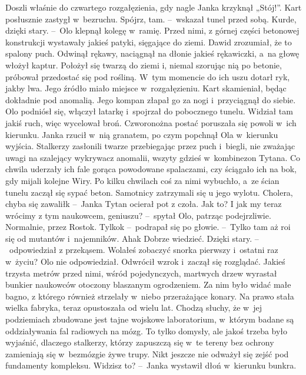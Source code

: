 \documentclass[../MAIN.tex]{subfiles}
\begin{document}
Doszli właśnie do czwartego rozgałęzienia, gdy nagle Janka krzyknął „Stój!”. Kart posłusznie zastygł w~bezruchu.
\sx Spójrz, tam. --~wskazał tunel przed sobą.
\xx Kurde, dzięki stary. --~Olo klepnął kolegę w~ramię.
\qd
\hspace{23.6em}Przed nimi, z górnej części betonowej konstrukcji wystawały jakieś patyki, sięgające do ziemi. Dawid zrozumiał, że to spalony puch. Odwinął rękawy, naciągnął na dłonie jakieś rękawiczki, a~na głowę włożył kaptur. Położył się twarzą do ziemi i, niemal szorując nią po betonie, próbował przedostać się pod rośliną. W~tym momencie do ich uszu dotarł ryk, jakby lwa. Jego źródło miało miejsce w~rozgałęzieniu. Kart skamieniał, będąc dokładnie pod anomalią. Jego kompan złapał go za nogi i~przyciągnął do siebie. Olo podniósł się, włączył latarkę i~spojrzał do pobocznego tunelu. Widział tam jakiś ruch, więc wycelował broń. Czworonożna postać poruszała się powoli w~ich kierunku. Janka rzucił w~nią granatem, po czym popchnął Ola w~kierunku wyjścia. Stalkerzy zasłonili twarze przebiegając przez puch i~biegli, nie zważając uwagi na szalejący wykrywacz anomalii, wszyty gdzieś w~kombinezon Tytana. Co chwila uderzały ich fale gorąca powodowane spalaczami, czy ściągało ich na bok, gdy mijali kolejne Wiry. Po
kilku chwilach coś
za nimi wybuchło, a~ze ścian tunelu zaczął się sypać beton. Samotnicy zatrzymali się u jego wylotu.
\sx Cholera, chyba się zawalił\3k --~Janka Tytan ocierał pot z czoła.
\xx Jak to? I jak my teraz wrócimy z tym naukowcem, geniuszu? --~spytał Olo, patrząc podejrzliwie.
\xx Normalnie, przez Rostok. Tylko\3k --~podrapał się po głowie. --~Tylko tam aż roi się od mutantów i~najemników.
\xx Aha\3k Dobrze wiedzieć. Dzięki stary. --~odpowiedział z przekąsem.
\xx Wolałeś zobaczyć snorka pierwszy i~ostatni raz w~życiu?
\qd
\hspace{26.2em}Olo nie odpowiedział. Odwrócił wzrok i~zaczął się rozglądać. Jakieś trzysta metrów przed nimi, wśród pojedynczych, martwych drzew wyrastał bunkier naukowców otoczony blaszanym ogrodzeniem. Za nim było widać małe bagno, z którego również strzelały w~niebo przerażające konary. Na prawo stała wielka fabryka, teraz opustoszała od wielu lat. Chodzą słuchy, że w~jej podziemiach zbudowane jest tajne wojskowe laboratorium, w~którym badane są oddziaływania fal radiowych na mózg. To tylko domysły, ale jakoś trzeba było wyjaśnić, dlaczego stalkerzy, którzy zapuszczą się w~te tereny bez ochrony zamieniają się w~bezmózgie żywe trupy. Nikt jeszcze nie odważył się zejść pod fundamenty kompleksu.
\sx Widzisz to? --~Janka wystawił dłoń w~kierunku bunkra.
\end{document}
